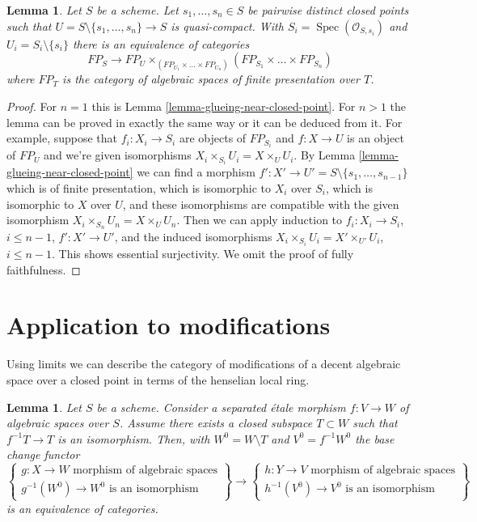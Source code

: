 \documentclass{stacks-project}
\theoremstyle{plain}
\newtheorem{lemma}[subsection]{Lemma}
\theoremstyle{definition}
\theoremstyle{remark}
\numberwithin{equation}{subsection}
\def\Spec{\mathop{\mathrm{Spec}}}
\begin{document}
\begin{lemma}
\label{lemma-glueing-near-multiple-closed-points}
Let $S$ be a scheme. Let $s_1, \ldots, s_n \in S$ be
pairwise distinct closed points such that
$U = S \setminus \{s_1, \ldots, s_n\} \to S$ is quasi-compact. With
$S_i = \Spec(\mathcal{O}_{S, s_i})$ and $U_i = S_i \setminus \{s_i\}$
there is an equivalence of categories
$$
FP_S \longrightarrow
FP_U \times_{(FP_{U_1} \times \ldots \times FP_{U_n})}
(FP_{S_1} \times \ldots \times FP_{S_n})
$$
where $FP_T$ is the category of algebraic spaces of finite presentation
over $T$.
\end{lemma}

\begin{proof}
For $n = 1$ this is Lemma \ref{lemma-glueing-near-closed-point}.
For $n > 1$ the lemma can be proved in exactly the same way or it
can be deduced from it. For example, suppose that $f_i : X_i \to S_i$
are objects of $FP_{S_i}$ and $f : X \to U$ is an object
of $FP_U$ and we're given isomorphisms $X_i \times_{S_i} U_i = X \times_U U_i$.
By Lemma \ref{lemma-glueing-near-closed-point} we can find
a morphism $f' : X' \to U' = S \setminus \{s_1, \ldots, s_{n - 1}\}$
which is of finite presentation, which is isomorphic to
$X_i$ over $S_i$, which is isomorphic to $X$ over $U$, and
these isomorphisms are compatible with the given isomorphism
$X_i \times_{S_n} U_n = X \times_U U_n$.
Then we can apply induction to
$f_i : X_i \to S_i$, $i \leq n - 1$,
$f' : X' \to U'$, and the induced
isomorphisms $X_i \times_{S_i} U_i = X' \times_{U'} U_i$, $i \leq n - 1$.
This shows essential surjectivity. We omit the proof of
fully faithfulness.
\end{proof}







\section{Application to modifications}
\label{section-modifications-at-a-point}

\noindent
Using limits we can describe the category of modifications of
a decent algebraic space over a closed point in terms of the
henselian local ring.

\begin{lemma}
\label{lemma-excision-modifications}
Let $S$ be a scheme. Consider a separated \'etale morphism
$f : V \to W$ of algebraic spaces over $S$.
Assume there exists a
closed subspace $T \subset W$ such that $f^{-1}T \to T$ is
an isomorphism. Then, with $W^0 = W \setminus T$ and
$V^0 = f^{-1}W^0$ the base change functor
$$
\left\{
\begin{matrix}
g : X \to W\text{ morphism of algebraic spaces} \\
g^{-1}(W^0) \to W^0\text{ is an isomorphism}
\end{matrix}
\right\}
\longrightarrow
\left\{
\begin{matrix}
h : Y \to V\text{ morphism of algebraic spaces} \\
h^{-1}(V^0) \to V^0\text{ is an isomorphism}
\end{matrix}
\right\}
$$
is an equivalence of categories.
\end{lemma}
\end{document}
